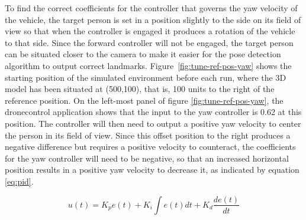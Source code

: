 To find the correct coefficients for the controller that governs the yaw velocity of the vehicle, the target person is set in a position slightly to the side on its field of view so that when the controller is engaged it produces a rotation of the vehicle to that side.
Since the forward controller will not be engaged, the target person can be situated closer to the camera to make it easier for the pose detection algorithm to output correct landmarks.
Figure~\ref{fig:tune-ref-pos-yaw} shows the starting position of the simulated environment before each run, where the 3D model has been situated at (500,100), that is, 100 units to the right of the reference position.
On the left-most panel of figure \ref{fig:tune-ref-pos-yaw}, the dronecontrol application shows that the input to the yaw controller is 0.62 at this position.
The controller will then need to output a positive yaw velocity to center the person in its field of view. 
Since this offset position to the right produces a negative difference but requires a positive velocity to counteract, the coefficients for the yaw controller will need to be negative, so that an increased horizontal position results in a positive yaw velocity to decrease it, as indicated by equation \ref{eq:pid}.

\begin{equation}
    u(t)= K_p e(t) + K_i \int{e(t)dt} + K_d \frac{de(t)}{dt}
    \label{eq:pid}
\end{equation}
        

